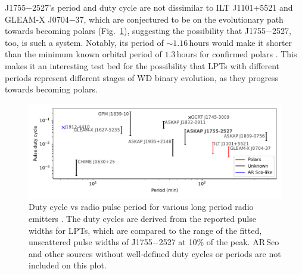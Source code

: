 \documentclass[fleqn,usenatbib]{mnras}
\newcommand{\src}{J1755$-$2527}
\newcommand{\Fig}{Fig.}
\begin{document}
\src{}'s period and duty cycle are not dissimilar to ILT J1101+5521 and GLEAM-X J0704$-$37, which are conjectured to be on the evolutionary path towards becoming polars (\Fig~\ref{fig:lpt_comparison}), suggesting the possibility that \src{}, too, is such a system.
Notably, its period of ${\sim}1.16\,$hours would make it shorter than the minimum known orbital period of $1.3\,$hours for confirmed polars \citep{schwope2025polarcatcatalogpolarslowaccretion}.
This makes it an interesting test bed for the possibility that LPTs with different periods represent different stages of WD binary evolution, as they progress towards becoming polars.
\begin{figure}
    \centering
    \includegraphics[width=0.98\linewidth]{lpt_comparison.pdf}
    \caption{Duty cycle vs radio pulse period for various long period radio emitters \citep{deRuiter2025,2022Natur.601..526H,2023Natur.619..487H,2024NatAs...8.1159C,2005Natur.434...50H,deRuiter2025,Lee2025,2024arXiv241116606W}. The duty cycles are derived from the reported pulse widths for LPTs, which are compared to the range of the fitted, unscattered pulse widths of \src{} at 10\% of the peak. AR\,Sco \citep{2016Natur.537..374M,2018A&A...611A..66S} and other sources without well-defined duty cycles or periods \citep[e.g.][and references therein]{2021ApJ...920...45W} are not included on this plot.}
    \label{fig:lpt_comparison}
\end{figure}
\end{document}
